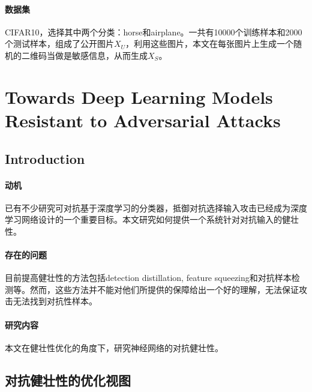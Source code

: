 \documentclass[12pt,a4paper]{article}
\begin{document}
\paragraph{数据集} CIFAR10，选择其中两个分类：horse和airplane。一共有10000个训练样本和2000个测试样本，组成了公开图片$X_U$，利用这些图片，本文在每张图片上生成一个随机的二维码当做是敏感信息，从而生成$X_S$。


\section{Towards Deep Learning Models Resistant to Adversarial Attacks}
\subsection{Introduction}
\paragraph{动机} 已有不少研究可对抗基于深度学习的分类器，抵御对抗选择输入攻击已经成为深度学习网络设计的一个重要目标。本文研究如何提供一个系统针对对抗输入的健壮性。
\paragraph{存在的问题} 目前提高健壮性的方法包括detection distillation, feature squeezing和对抗样本检测等。然而，这些方法并不能对他们所提供的保障给出一个好的理解，无法保证攻击无法找到对抗性样本。
\paragraph{研究内容} 本文在健壮性优化的角度下，研究神经网络的对抗健壮性。
\subsection{对抗健壮性的优化视图}

























\end{document}
